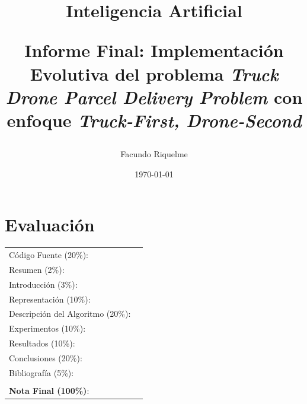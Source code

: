 \documentclass[letter, 10pt]{article}
\begin{document}
\title{Inteligencia Artificial \\ \begin{Large}Informe Final: Implementación Evolutiva del problema \textit{Truck Drone Parcel Delivery Problem} con enfoque \textit{Truck-First, Drone-Second}\end{Large}}
\author{Facundo Riquelme}
\date{\today}
\maketitle


\section*{Evaluaci\'on}

\begin{tabular}{ll}
Código Fuente (20\%): & \underline{\hspace{2cm}} \\
Resumen (2\%): & \underline{\hspace{2cm}} \\
Introducci\'on (3\%):  & \underline{\hspace{2cm}} \\
Representación (10\%):  & \underline{\hspace{2cm}} \\
Descripción del Algoritmo (20\%):  & \underline{\hspace{2cm}} \\
Experimentos (10\%): &  \underline{\hspace{2cm}}\\
Resultados (10\%): &  \underline{\hspace{2cm}}\\
Conclusiones (20\%): & \underline{\hspace{2cm}}\\
Bibliograf\'ia (5\%): & \underline{\hspace{2cm}}\\
 &  \\
\textbf{Nota Final (100\%)}:   & \underline{\hspace{2cm}}
\end{tabular}
\vspace{0.15cm}

\begin{abstract}

\end{abstract}
\end{document}
